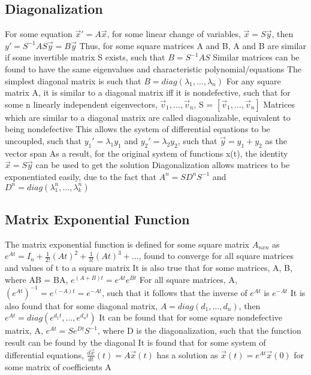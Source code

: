 \documentclass[11 pt, twoside]{article}
\newenvironment{outline*}
{
	\begin{outline}[enumerate]
	}
	{\end{outline}
}
\begin{document}
\subsection{Diagonalization}
\begin{outline*}
\1 For some equation $\vec{x}' = A\vec{x}$, for some linear change of variables, $\vec{x} = S\vec{y}$, then $y' = S^{-1}AS\vec{y} = B\vec{y}$
\2 Thus, for some square matrices A and B, A and B are similar if  some invertible matrix S exists, such that $B = S^{-1}AS$
\2 Similar matrices can be found to have the same eigenvalues and characteristic polynomial/equations
\1 The simplest diagonal matrix is such that $B = diag(\lambda_1, \dots, \lambda_n)$
\2 For any square matrix A, it is similar to a diagonal matrix iff it is nondefective, such that for some n linearly independent eigenvectors, $\vec{v}_1, \dots, \vec{v}_n$, S = $[\vec{v}_1, \dots, \vec{v}_n]$
\2 Matrices which are similar to a diagonal matrix are called diagonalizable, equivalent to being nondefective
\2 This allows the system of differential equations to be uncoupled, such that $y_1' = \lambda_1y_1$ and $y_2' = \lambda_2 y_2$, such that $\vec{y} = y_1 + y_2$ as the vector span
\3 As a result, for the original system of functions x(t), the identity $\vec{x} = S\vec{y}$ can be used to get the solution
\2 Diagonalization allows matrices to be exponentiated easily, due to the fact that $A^n = SD^nS^{-1}$ and $D^n = diag(\lambda_1^n, \dots, \lambda_k^n)$
\end{outline*}
\subsection{Matrix Exponential Function}
\begin{outline*}
\1 The matrix exponential function is defined for some square matrix $A_{nxn}$ as $e^{At} = I_n + \frac{1}{2!}(At)^2 + \frac{1}{3!}(At)^3 + \dots$, found to converge for all square matrices and values of t to a square matrix
\2 It is also true that for some matrices, A, B, where AB = BA, $e^{(A + B)t} = e^{At}e^{Bt}$
\2 For all square matrices, A, $(e^{At})^{-1} = e^{(-A)t} = e^{-At}$, such that it follows that the inverse of $e^{At}$ is $e^{-At}$
\2 It is also found that for some diagonal matrix, $A = diag(d_1, \dots, d_n)$, then $e^{At} = diag(e^{d_1t}, \dots, e^{d_nt})$
\1 It can be found that for some square nondefective matrix, A, $e^{At} = Se^{Dt}S^{-1}$, where D is the diagonalization, such that the function result can be found by the diagonal
\1 It is found that for some system of differential equations, $\frac{d\vec{x}}{dt}(t) = A\vec{x}(t)$ has a solution as $\vec{x}(t) = e^{At}\vec{x}(0)$ for some matrix of coefficients A
\end{outline*}
\end{document}

